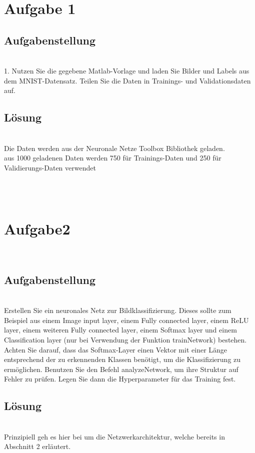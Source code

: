 \documentclass[8pt,a4paper]{article}
\begin{document}
\section{Aufgabe 1}

\subsection{Aufgabenstellung}
\\
1. Nutzen Sie die gegebene Matlab-Vorlage und laden Sie Bilder und Labels aus dem MNIST-Datensatz. Teilen Sie die Daten in Trainings- und
Validationsdaten auf.
\\
\subsection{Lösung}
\\
Die Daten werden aus der Neuronale Netze Toolbox Bibliothek geladen.\\
aus 1000 geladenen Daten werden 750 für Trainings-Daten und 250 für Validierungs-Daten verwendet

\\



\\

\section{Aufgabe2}
\\
\subsection{Aufgabenstellung}
\\
Erstellen Sie ein neuronales Netz zur Bildklassifizierung. Dieses sollte zum Beispiel aus einem Image input layer, einem Fully connected
layer, einem ReLU layer, einem weiteren Fully connected layer, einem Softmax layer und einem Classification layer (nur bei Verwendung der Funktion trainNetwork) bestehen. Achten Sie darauf, dass
das Softmax-Layer einen Vektor mit einer Länge entsprechend der zu
erkennenden Klassen benötigt, um die Klassifizierung zu ermöglichen.
Benutzen Sie den Befehl analyzeNetwork, um ihre Struktur auf Fehler
zu prüfen. Legen Sie dann die Hyperparameter für das Training fest.
\\
\subsection{Lösung}
\\
Prinzipiell geh es hier bei um die Netzwerkarchitektur, welche bereits in Abschnitt 2 erläutert.
\end{document}
